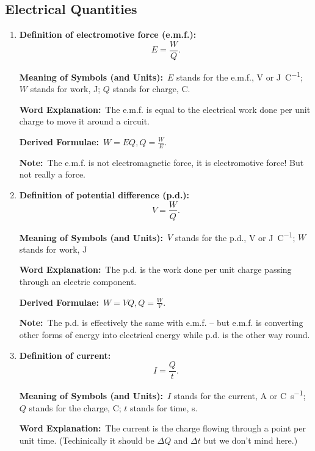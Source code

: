 \documentclass[8pt]{article}
\newcommand{\MeanSymb}{\textbf{Meaning of Symbols (and Units):}\ }
\newcommand{\WordExpl}{\textbf{Word Explanation:}\ }
\newcommand{\DeriForm}{\textbf{Derived Formulae:}\ }
\newcommand{\Note}{\textbf{Note:}\ }
\begin{document}
        \subsection{Electrical Quantities}
            \begin{enumerate}
                \item \textbf{Definition of electromotive force (e.m.f.):}
                \[
                    E = \frac{W}{Q}.
                \]

                \MeanSymb \(E\) stands for the e.m.f., \unit{\volt} or \unit{\joule\per\coulomb}; \(W\) stands for work, \unit{\joule}; \(Q\) stands for charge, \unit{\coulomb}.

                \WordExpl The e.m.f. is equal to the electrical work done per unit charge to move it around a circuit.

                \DeriForm \(W = EQ, Q = \frac{W}{E}\).

                \Note The e.m.f. is not electromagnetic force, it is electromotive force! But not really a force.

                \item \textbf{Definition of potential difference (p.d.):}
                \[
                    V = \frac{W}{Q}.
                \]

                \MeanSymb \(V\) stands for the p.d., \unit{\volt} or \unit{\joule\per\coulomb}; \(W\) stands for work, \unit{\joule}

                \WordExpl The p.d. is the work done per unit charge passing through an electric component.

                \DeriForm \(W = VQ, Q = \frac{W}{V}\).

                \Note The p.d. is effectively the same with e.m.f. -- but e.m.f. is converting other forms of energy into electrical energy while p.d. is the other way round.

                \item \textbf{Definition of current:}
                \[
                    I = \frac{Q}{t}.
                \]

                \MeanSymb \(I\) stands for the current, \unit{\ampere} or \unit{\coulomb\per\second}; \(Q\) stands for the charge, \unit{\coulomb}; \(t\) stands for time, \unit{\second}.

                \WordExpl The current is the charge flowing through a point per unit time. (Techinically it should be \(\Delta Q\) and \(\Delta t\) but we don't mind here.)


\end{enumerate}
\end{document}
